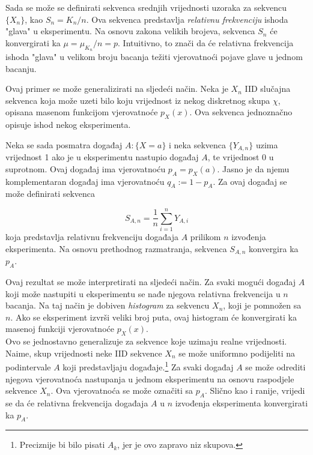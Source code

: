 Sada se može se definirati sekvenca srednjih vrijednosti uzoraka za sekvencu
$\{X_n\}$, kao $S_n = K_n / n$. Ova sekvenca predstavlja \textit{relativnu
frekvenciju} ishoda "glava" u eksperimentu. Na osnovu zakona velikih brojeva,
sekvenca $S_n$ će konvergirati ka $\mu = \mu_{K_n}/n = p$.  Intuitivno, to znači
da će relativna frekvencija ishoda "glava" u velikom broju bacanja težiti
vjerovatnoći pojave glave u jednom bacanju.

Ovaj primer se može generalizirati na sljedeći način. Neka je $X_n$ IID slučajna
sekvenca koja može uzeti bilo koju vrijednost iz nekog diskretnog skupa $\chi$,
opisana masenom funkcijom vjerovatnoće $p_{X}(x)$. Ova sekvenca jednoznačno
opisuje ishod nekog eksperimenta.

Neka se sada posmatra događaj $A:\{X=a\}$ i neka sekvenca $\{Y_{A,n}\}$ uzima
vrijednost 1 ako je u eksperimentu nastupio događaj $A$, te vrijednost 0 u
suprotnom. Ovaj događaj ima vjerovatnoću $p_A=p_X(a)$. Jasno je da njemu
komplementaran događaj ima vjerovatnoću $q_A:=1-p_A$. Za ovaj događaj se može
definirati sekvenca

\begin{equation}
    S_{A,n} = \frac{1}{n}\sum_{i=1}^{n} Y_{A,i}
\end{equation}
%
koja predstavlja relativnu frekvenciju događaja $A$ prilikom $n$ izvođenja
eksperimenta. Na osnovu prethodnog razmatranja, sekvenca $S_{A,n}$ konvergira ka
$p_A$.

Ovaj rezultat se može interpretirati na sljedeći način. Za svaki mogući događaj
$A$ koji može nastupiti u eksperimentu se nađe njegova relativna frekvencija u
$n$ bacanja. Na taj način je dobiven \textit{histogram} za sekvencu $X_n$, koji
je pomnožen sa $n$. Ako se eksperiment izvrši veliki broj puta, ovaj histogram
će konvergirati ka masenoj funkciji vjerovatnoće $p_X(x)$. \\

Ovo se jednostavno generalizuje za sekvence koje uzimaju realne vrijednosti.
Naime, skup vrijednosti neke IID sekvence $X_n$ se može uniformno podijeliti na
podintervale $A$ koji predstavljaju događaje.\footnote{Preciznije bi bilo pisati
$A_k$, jer je ovo zapravo niz skupova.} Za svaki događaj $A$ se može odrediti
njegova vjerovatnoća nastupanja u jednom eksperimentu na osnovu raspodjele
sekvence $X_n$. Ova vjerovatnoća se može označiti sa $p_A$. Slično kao i ranije,
vrijedi se da će relativna frekvencija događaja $A$ u $n$ izvođenja eksperimenta
konvergirati ka $p_A$.

